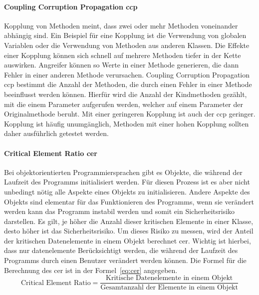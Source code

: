 \documentclass[12pt, a4paper, ngerman]{article}
\begin{document}
\paragraph{Coupling Corruption Propagation \ac{ccp}}

Kopplung von Methoden meint, dass zwei oder mehr Methoden voneinander abhängig sind.
Ein Beispiel für eine Kopplung ist die Verwendung von globalen Variablen oder 
die Verwendung von Methoden aus anderen Klassen.
Die Effekte einer Kopplung können sich schnell auf mehrere Methoden tiefer in der Kette auswirken.
Angreifer können so Werte in einer Methode generieren, die dann Fehler in einer anderen Methode verursachen.
Coupling Corruption Propagation \ac{ccp} bestimmt die Anzahl der Methoden, 
die durch einen Fehler in einer Methode beeinflusst werden können.
Hierfür wird die Anzahl der Kindmethoden gezählt, mit die einem Parameter aufgerufen werden, 
welcher auf einem Parameter der Originalmethode beruht.
Mit einer geringeren Kopplung ist auch der \ac{ccp} geringer.
Kopplung ist häufig unumgänglich, Methoden mit einer hohen Kopplung sollten daher ausführlich getestet werden.

\paragraph{Critical Element Ratio \ac{cer}}

Bei objektorientierten Programmiersprachen gibt es Objekte, 
die während der Laufzeit des Programms initialisiert werden. 
Für diesen Prozess ist es aber nicht unbedingt nötig alle Aspekte eines Objekts zu initialisieren.
Andere Aspekte des Objekts sind elementar für das Funktionieren des Programms, 
wenn sie verändert werden kann das Programm instabil werden und somit ein Sicherheitsrisiko darstellen.
Es gilt, je höher die Anzahl dieser kritischen Elemente in einer Klasse, desto höher ist das Sicherheitsrisiko.
Um dieses Risiko zu messen, wird der Anteil der kritischen Datenelemente in einem Objekt berechnet \ac{cer}.
Wichtig ist hierbei, dass nur datenelemente Berücksichtigt werden, 
die während der Laufzeit des Programms durch einen Benutzer verändert werden können.
Die Formel für die Berechnung des \ac{cer} ist in der Formel~\ref{eq:cer} angegeben.
\begin{equation} \label{eq:cer}
  \text{Critical Element Ratio} = \frac{ \text{Kritische Datenelemente in einem Objekt} }{ \text{Gesamtanzahl der Elemente in einem Objekt} }
\end{equation}
\end{document}
